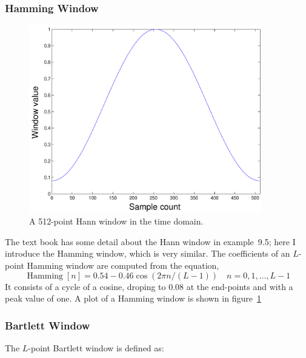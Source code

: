 \subsubsection{Hamming Window}

\begin{figure}
\centerline{\includegraphics[width=4in]{ch-fft/ufft_hamming_w512}}
\caption{A 512-point Hann window in the time domain.\label{fig:ufft-hmw}}
\end{figure}

The text book has some detail about the Hann window in example~9.5;
here I introduce the Hamming window, which is very similar. The
coefficients of an $L$-point Hamming window are computed from the
equation,
\begin{equation}
\operatorname{Hamming}[n]
    = 0.54 - 0.46 \cos(2\pi n/(L-1))
          \quad n=0,1,\ldots,L-1
\label{eq:ufft-hnw}
\end{equation}
It consists of a cycle of a cosine, droping to 0.08 at the end-points
and with a peak value of one. A plot of a Hamming window is shown in
figure~\ref{fig:ufft-hmw}

\subsubsection{Bartlett Window}

The $L$-point Bartlett window is defined as:

